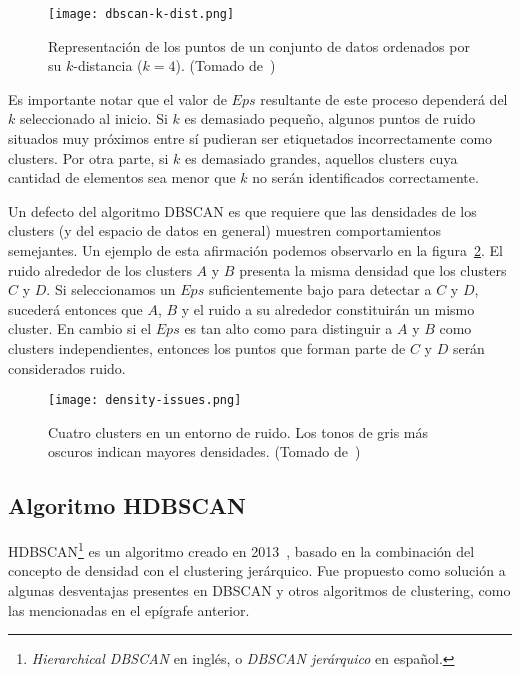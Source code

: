 \begin{figure}[!h]
    \centering
    \texttt{[image: dbscan-k-dist.png]}
    \caption{Representación de los puntos de un conjunto de datos ordenados por su $k$-distancia ($k=4$). (Tomado de~\cite{Tan05})}
    \label{img:dbscan-k-dist}
\end{figure}

Es importante notar que el valor de $Eps$ resultante de este proceso dependerá del $k$ seleccionado al inicio.
Si $k$ es demasiado pequeño, algunos puntos de ruido situados muy próximos entre sí pudieran ser etiquetados incorrectamente como clusters.
Por otra parte, si $k$ es demasiado grandes, aquellos clusters cuya cantidad de elementos sea menor que $k$ no serán identificados correctamente.

Un defecto del algoritmo DBSCAN es que requiere que las densidades de los clusters (y del espacio de datos en general) muestren comportamientos semejantes.
Un ejemplo de esta afirmación podemos observarlo en la figura~\ref{img:density-issues}.
El ruido alrededor de los clusters $A$ y $B$ presenta la misma densidad que los clusters $C$ y $D$.
Si seleccionamos un $Eps$ suficientemente bajo para detectar a $C$ y $D$, sucederá entonces que $A$, $B$ y el ruido a su alrededor constituirán un mismo cluster.
En cambio si el $Eps$ es tan alto como para distinguir a $A$ y $B$ como clusters independientes, entonces los puntos que forman parte de $C$ y $D$ serán considerados ruido.

\begin{figure}[!h]
    \centering
    \texttt{[image: density-issues.png]}
    \caption{Cuatro clusters en un entorno de ruido.
    Los tonos de gris más oscuros indican mayores densidades. (Tomado de~\cite{Tan05})}
    \label{img:density-issues}
\end{figure}

\subsection{Algoritmo HDBSCAN}\label{subsec:HDBSCAN}

HDBSCAN\footnote{\textit{Hierarchical DBSCAN} en inglés, o \textit{DBSCAN jerárquico} en español.} es un algoritmo creado en 2013~\cite{Campello13}, basado en la combinación del concepto de densidad con el clustering jerárquico.
Fue propuesto como solución a algunas desventajas presentes en DBSCAN y otros algoritmos de clustering, como las mencionadas en el epígrafe anterior.

